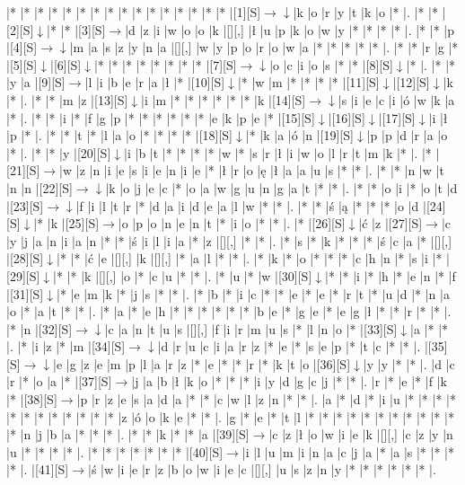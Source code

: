 \documentclass[11pt]{article}
\newcommand\drarr{$\rightarrow \!\!\!\!\! \downarrow$}
\newcommand\rarr{$\rightarrow$}
\newcommand\darr{$\downarrow$}
\begin{document}
\noindent\begin{Puzzle}{24}{28}|*	|*	|*	|*	|*	|*	|*	|*	|*	|*	|*	|*	|*	|*	|*	|*	|[1][S]\drarr	|k	|o	|r	|y	|t	|k	|o	|*	|.
|*	|*	|[2][S]\darr	|*	|*	|[3][S]\rarr	|d	|z	|i	|w	|o	|o	|k	|[][,]{ }	|ł	|u	|p	|k	|o	|w	|y	|*	|*	|*	|*	|.
|*	|*	|p	|[4][S]\drarr	|m	|a	|s	|z	|y	|n	|a	|[][,]{ }	|w	|y	|p	|o	|r	|o	|w	|a	|*	|*	|*	|*	|*	|.
|*	|*	|r	|g	|*	|[5][S]\darr	|[6][S]\darr	|*	|*	|*	|*	|*	|*	|*	|*	|[7][S]\drarr	|o	|c	|i	|o	|s	|*	|*	|[8][S]\darr	|*	|.
|*	|*	|y	|a	|[9][S]\rarr	|l	|i	|b	|e	|r	|a	|ł	|*	|[10][S]\darr	|*	|w	|m	|*	|*	|*	|*	|[11][S]\darr	|[12][S]\darr	|k	|*	|.
|*	|*	|m	|z	|[13][S]\darr	|i	|m	|*	|*	|*	|*	|*	|*	|k	|[14][S]\drarr	|s	|i	|e	|c	|i	|ó	|w	|k	|a	|*	|.
|*	|*	|i	|*	|f	|g	|p	|*	|*	|*	|*	|*	|*	|e	|k	|p	|e	|*	|[15][S]\darr	|[16][S]\darr	|[17][S]\darr	|i	|ł	|p	|*	|.
|*	|*	|t	|*	|l	|a	|o	|*	|*	|*	|*	|[18][S]\darr	|*	|k	|a	|ó	|n	|[19][S]\darr	|p	|p	|d	|r	|a	|o	|*	|.
|*	|*	|y	|[20][S]\darr	|i	|b	|t	|*	|*	|*	|*	|w	|*	|s	|r	|ł	|i	|w	|o	|l	|r	|t	|m	|k	|*	|.
|*	|[21][S]\rarr	|w	|z	|n	|i	|e	|s	|i	|e	|n	|i	|e	|*	|ł	|r	|o	|ę	|ł	|a	|a	|u	|s	|*	|*	|.
|*	|*	|n	|w	|t	|n	|n	|[22][S]\drarr	|k	|o	|j	|e	|c	|*	|o	|a	|w	|g	|u	|n	|g	|a	|t	|*	|*	|.
|*	|*	|o	|i	|*	|o	|t	|d	|[23][S]\drarr	|f	|i	|l	|t	|r	|*	|d	|a	|i	|d	|e	|a	|l	|w	|*	|*	|.
|*	|*	|ś	|ą	|*	|*	|*	|o	|d	|[24][S]\darr	|*	|k	|[25][S]\rarr	|o	|p	|o	|n	|e	|n	|t	|*	|i	|o	|*	|*	|.
|*	|[26][S]\darr	|ć	|z	|[27][S]\rarr	|c	|y	|j	|a	|n	|i	|a	|n	|*	|*	|ś	|i	|l	|i	|a	|*	|z	|[][,]{ }	|*	|*	|.
|*	|s	|*	|k	|*	|*	|*	|ś	|c	|a	|*	|[][,]{ }	|[28][S]\darr	|*	|*	|ć	|e	|[][,]{ }	|k	|[][,]{ }	|*	|a	|l	|*	|*	|.
|*	|k	|*	|o	|*	|*	|*	|c	|h	|n	|*	|s	|i	|*	|[29][S]\darr	|*	|*	|k	|[][,]{ }	|o	|*	|c	|u	|*	|*	|.
|*	|u	|*	|w	|[30][S]\darr	|*	|*	|i	|*	|h	|*	|e	|n	|*	|f	|[31][S]\darr	|*	|e	|m	|k	|*	|j	|s	|*	|*	|.
|*	|b	|*	|i	|c	|*	|*	|e	|*	|e	|*	|r	|t	|*	|u	|d	|*	|n	|a	|o	|*	|a	|t	|*	|*	|.
|*	|a	|*	|e	|h	|*	|*	|*	|*	|*	|*	|b	|e	|*	|g	|e	|*	|e	|g	|ł	|*	|*	|r	|*	|*	|.
|*	|n	|[32][S]\drarr	|c	|a	|n	|t	|u	|s	|[][,]{ }	|f	|i	|r	|m	|u	|s	|*	|l	|n	|o	|*	|[33][S]\darr	|a	|*	|*	|.
|*	|i	|z	|*	|m	|[34][S]\drarr	|d	|r	|u	|c	|i	|a	|r	|z	|*	|e	|*	|s	|e	|p	|*	|t	|c	|*	|*	|.
|[35][S]\drarr	|e	|g	|z	|e	|m	|p	|l	|a	|r	|z	|*	|e	|*	|*	|r	|*	|k	|t	|o	|[36][S]\darr	|y	|y	|*	|*	|.
|d	|c	|r	|*	|o	|a	|*	|[37][S]\rarr	|j	|a	|b	|ł	|k	|o	|*	|*	|*	|i	|y	|d	|g	|c	|j	|*	|*	|.
|r	|*	|e	|*	|f	|k	|*	|[38][S]\rarr	|p	|r	|z	|e	|s	|a	|d	|a	|*	|*	|c	|w	|l	|z	|n	|*	|*	|.
|a	|*	|d	|*	|i	|u	|*	|*	|*	|*	|*	|*	|*	|*	|*	|*	|*	|*	|z	|ó	|o	|k	|e	|*	|*	|.
|g	|*	|e	|*	|t	|l	|*	|*	|*	|*	|*	|*	|*	|*	|*	|*	|*	|*	|n	|j	|b	|a	|*	|*	|*	|.
|*	|*	|k	|*	|*	|a	|[39][S]\rarr	|c	|z	|ł	|o	|w	|i	|e	|k	|[][,]{ }	|c	|z	|y	|n	|u	|*	|*	|*	|*	|.
|*	|*	|*	|*	|*	|*	|*	|[40][S]\rarr	|i	|l	|u	|m	|i	|n	|a	|c	|j	|a	|*	|a	|s	|*	|*	|*	|*	|.
|[41][S]\rarr	|ś	|w	|i	|e	|r	|z	|b	|o	|w	|i	|e	|c	|[][,]{ }	|u	|s	|z	|n	|y	|*	|*	|*	|*	|*	|*	|.\end{Puzzle}
\end{document}

